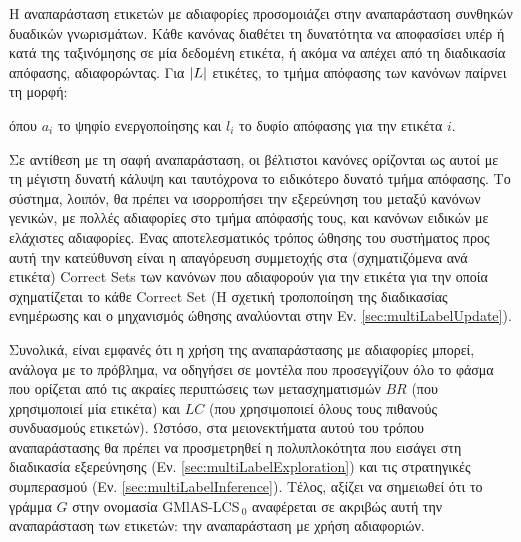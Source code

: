Η αναπαράσταση ετικετών με αδιαφορίες προσομοιάζει στην αναπαράσταση συνθηκών δυαδικών γνωρισμάτων. Κάθε κανόνας διαθέτει τη δυνατότητα να αποφασίσει υπέρ ή κατά της ταξινόμησης σε μία δεδομένη ετικέτα, ή ακόμα να απέχει από τη διαδικασία απόφασης, αδιαφορώντας. Για $\lvert L\rvert$ ετικέτες, το τμήμα απόφασης των κανόνων παίρνει τη μορφή:
\\

\begin{center}

\end{center}



όπου $a_{i}$ το ψηφίο ενεργοποίησης και $l_{i}$ το δυφίο απόφασης για την ετικέτα $i$.

Σε αντίθεση με τη σαφή αναπαράσταση, οι βέλτιστοι κανόνες ορίζονται ως αυτοί με τη μέγιστη δυνατή κάλυψη και ταυτόχρονα το ειδικότερο δυνατό τμήμα απόφασης. Το σύστημα, λοιπόν, θα πρέπει να ισορροπήσει την εξερεύνηση του μεταξύ κανόνων γενικών, με πολλές αδιαφορίες στο τμήμα απόφασής τους, και κανόνων ειδικών με ελάχιστες αδιαφορίες. Ένας αποτελεσματικός τρόπος ώθησης του συστήματος προς αυτή την κατεύθυνση είναι η απαγόρευση συμμετοχής στα (σχηματιζόμενα ανά ετικέτα) Correct Sets των κανόνων που αδιαφορούν για την ετικέτα για την οποία σχηματίζεται το κάθε Correct Set (Η σχετική τροποποίηση της διαδικασίας ενημέρωσης και ο μηχανισμός ώθησης αναλύονται στην Εν. \ref{sec:multiLabelUpdate}). 

Συνολικά, είναι εμφανές ότι η χρήση της αναπαράστασης με αδιαφορίες μπορεί, ανάλογα με το πρόβλημα, να οδηγήσει σε μοντέλα που προσεγγίζουν όλο το φάσμα που ορίζεται από τις ακραίες περιπτώσεις των μετασχηματισμών $BR$ (που χρησιμοποιεί μία ετικέτα) και $LC$ (που χρησιμοποιεί όλους τους πιθανούς συνδυασμούς ετικετών). Ωστόσο, στα μειονεκτήματα αυτού του τρόπου αναπαράστασης θα πρέπει να προσμετρηθεί η πολυπλοκότητα που εισάγει στη διαδικασία εξερεύνησης (Εν. \ref{sec:multiLabelExploration}) και τις στρατηγικές συμπερασμού (Εν. \ref{sec:multiLabelInference}). Τέλος, αξίζει να σημειωθεί ότι το γράμμα $G$ στην ονομασία GMlAS-LCS$_{\:0}$ αναφέρεται σε ακριβώς αυτή την αναπαράσταση των ετικετών: την αναπαράσταση με χρήση αδιαφοριών.




